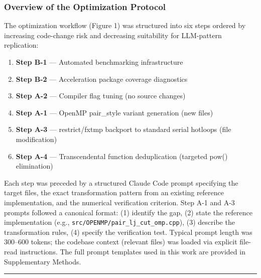 \documentclass[
  11pt,
]{article}
\providecommand{\tightlist}{%
  \setlength{\itemsep}{0pt}\setlength{\parskip}{0pt}}
\begin{document}
\subsubsection{Overview of the Optimization
Protocol}\label{overview-of-the-optimization-protocol}

The optimization workflow (Figure 1) was structured into six steps
ordered by increasing code-change risk and decreasing suitability for
LLM-pattern replication:

\begin{enumerate}
\def\labelenumi{\arabic{enumi}.}
\tightlist
\item
  \textbf{Step B-1} --- Automated benchmarking infrastructure
\item
  \textbf{Step B-2} --- Acceleration package coverage diagnostics
\item
  \textbf{Step A-2} --- Compiler flag tuning (no source changes)
\item
  \textbf{Step A-1} --- OpenMP pair\_style variant generation (new
  files)
\item
  \textbf{Step A-3} --- restrict/fxtmp backport to standard serial
  hotloops (file modification)
\item
  \textbf{Step A-4} --- Transcendental function deduplication (targeted
  pow() elimination)
\end{enumerate}

Each step was preceded by a structured Claude Code prompt specifying the
target files, the exact transformation pattern from an existing
reference implementation, and the numerical verification criterion. Step
A-1 and A-3 prompts followed a canonical format: (1) identify the gap,
(2) state the reference implementation (e.g.,
\texttt{src/OPENMP/pair\_lj\_cut\_omp.cpp}), (3) describe the
transformation rules, (4) specify the verification test. Typical prompt
length was 300--600 tokens; the codebase context (relevant files) was
loaded via explicit file-read instructions. The full prompt templates
used in this work are provided in Supplementary Methods.

\begin{center}\rule{0.5\linewidth}{0.5pt}\end{center}
\end{document}
